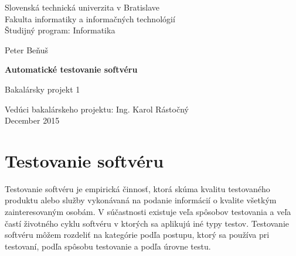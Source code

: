 \documentclass[11pt,twoside,slovak,a4paper]{article}
\begin{document}
	
	\begin{titlepage}
		\newlength{\myind}
		\addtolength{\myind}{57mm}
		
		\newlength{\myrulelength}
		\addtolength{\myrulelength}{.6\marginparwidth}
		\addtolength{\myrulelength}{\textwidth}
		\newcommand{\myrule}{\parbox{\myrulelength}{\hrulefill}}
		\newcommand{\mybox}[1]{\parbox{\myrulelength}{#1}}
		\newcommand{\mycbox}[1]{\parbox{\myrulelength}{\centering #1}}
		
		\centering
		\large 		Slovenská technická univerzita v Bratislave\\
		Fakulta informatiky a informačných technológií\\
		Študijný program: Informatika
		
		\vspace{4mm}
		\myrule
		
		\vspace{55mm}
		
		\mycbox{Peter Beňuš}
		
		\vspace{10mm}
		
		\mycbox{\LARGE \textbf{Automatické testovanie softvéru}}
		
		\vspace{4mm}
		\mycbox{\large Bakalársky projekt 1}
		
		
		\vfill
		\begin{flushleft}
			Vedúci bakalárskeho projektu: Ing. Karol Rástočný\\
			December 2015
		\end{flushleft}
	\end{titlepage}
	
	
	
	
	\tableofcontents
	
	
	\pagestyle{fancy}
	\headheight 14pt
	
	\section{Testovanie softvéru}
	Testovanie softvéru je empirická činnosť, ktorá skúma kvalitu testovaného produktu alebo služby vykonávaná na podanie informácií o kvalite všetkým zainteresovaným osobám\cite{Kaner2006}. V súčastnosti existuje veľa spôsobov testovania a veľa častí životného cyklu softvéru v ktorých sa aplikujú iné typy testov. Testovanie softvéru môžem rozdeliť na kategórie podľa postupu, ktorý sa používa pri testovaní, podľa spôsobu testovanie a podľa úrovne testu.
	
\end{document}
